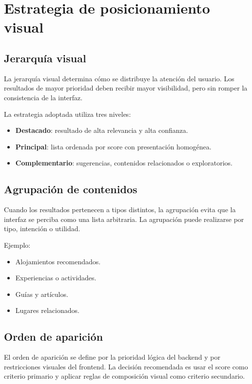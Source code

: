 \documentclass[12pt,a4paper]{article}
\begin{document}
\section{Estrategia de posicionamiento visual}

\subsection{Jerarquía visual}

La jerarquía visual determina cómo se distribuye la atención del usuario. Los resultados de mayor prioridad deben recibir mayor visibilidad, pero sin romper la consistencia de la interfaz.

La estrategia adoptada utiliza tres niveles:

\begin{itemize}[noitemsep]
    \item \textbf{Destacado}: resultado de alta relevancia y alta confianza.
    \item \textbf{Principal}: lista ordenada por score con presentación homogénea.
    \item \textbf{Complementario}: sugerencias, contenidos relacionados o exploratorios.
\end{itemize}

\subsection{Agrupación de contenidos}

Cuando los resultados pertenecen a tipos distintos, la agrupación evita que la interfaz se perciba como una lista arbitraria. La agrupación puede realizarse por tipo, intención o utilidad.

Ejemplo:

\begin{itemize}[noitemsep]
    \item Alojamientos recomendados.
    \item Experiencias o actividades.
    \item Guías y artículos.
    \item Lugares relacionados.
\end{itemize}

\subsection{Orden de aparición}

El orden de aparición se define por la prioridad lógica del backend y por restricciones visuales del frontend. La decisión recomendada es usar el score como criterio primario y aplicar reglas de composición visual como criterio secundario.
\end{document}
